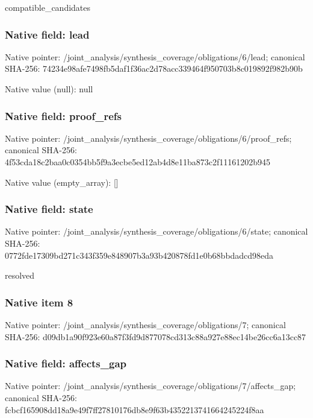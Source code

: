 \documentclass[10pt,a4paper]{article}
\begin{document}
\begingroup\raggedright\sloppy compatible\_\allowbreak{}candidates\par\endgroup

\subsubsection{Native field: lead}
Native pointer: /joint\_\allowbreak{}analysis/synthesis\_\allowbreak{}coverage/obligations/6/lead; canonical SHA-256: 74234e98afe7498fb5daf1f36ac2d78acc339464f950703b8c019892f982b90b

Native value (null): null

\subsubsection{Native field: proof\_\allowbreak{}refs}
Native pointer: /joint\_\allowbreak{}analysis/synthesis\_\allowbreak{}coverage/obligations/6/proof\_\allowbreak{}refs; canonical SHA-256: 4f53cda18c2baa0c0354bb5f9a3ecbe5ed12ab4d8e11ba873c2f11161202b945

Native value (empty\_\allowbreak{}array): []

\subsubsection{Native field: state}
Native pointer: /joint\_\allowbreak{}analysis/synthesis\_\allowbreak{}coverage/obligations/6/state; canonical SHA-256: 0772fde17309bd271c343f359e848907b3a93b420878fd1e0b68bbdadcd98eda

\begingroup\raggedright\sloppy resolved\par\endgroup

\subsubsection{Native item 8}
Native pointer: /joint\_\allowbreak{}analysis/synthesis\_\allowbreak{}coverage/obligations/7; canonical SHA-256: d09db1a90f923e60a87f3fd9d877078cd313c88a927e88ec14be26cc6a13cc87

\subsubsection{Native field: affects\_\allowbreak{}gap}
Native pointer: /joint\_\allowbreak{}analysis/synthesis\_\allowbreak{}coverage/obligations/7/affects\_\allowbreak{}gap; canonical SHA-256: fcbcf165908dd18a9e49f7ff27810176db8e9f63b4352213741664245224f8aa
\end{document}
